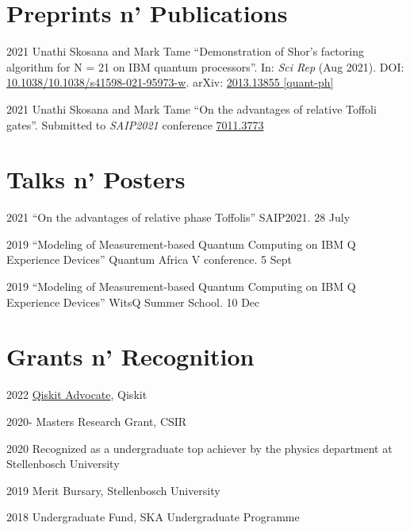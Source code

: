 \documentclass[12pt,letterpaper]{report}
\begin{document}
	\section*{Preprints n' Publications}
	\begin{tablist}
  \item[2021] \tab{}Unathi Skosana and Mark Tame \enquote{Demonstration of Shor’s factoring algorithm for N = 21 on IBM quantum processors}. In: \textit{Sci Rep} (Aug 2021). DOI: \href{https://doi.org/10.1038/s41598-021-95973-w}{10.1038/10.1038/s41598-021-95973-w}. arXiv: \href{https://arxiv.org/abs/2103.13855}{2013.13855 [quant-ph]}
	\item[2021] \tab{}Unathi Skosana and Mark Tame \enquote{On the advantages of relative Toffoli gates}. Submitted to \textit{SAIP2021} conference \href{https://events.saip.org.za/event/206/papers/7011/files/3773-on_the_advantages_of_relative_toffoli_gates.pdf}{7011.3773}
	\end{tablist}


	\section*{Talks n' Posters}

	\begin{tablist}
       \item[2021] \tab{}\enquote{On the advantages of relative phase Toffolis} SAIP2021. 28 July
	   \item[2019] \tab{}\enquote{Modeling of Measurement-based Quantum Computing on IBM Q Experience Devices} Quantum Africa V conference. 5 Sept
       \item[2019] \tab{}\enquote{Modeling of Measurement-based Quantum Computing on IBM Q Experience Devices} WitsQ Summer School. 10 Dec
	\end{tablist}

	\section*{Grants n' Recognition}

	\begin{tablist}
    \item[2022] \tab{} \href{https://qiskit.org/advocates/}{Qiskit Advocate},
      Qiskit
		\item[2020-] \tab{}Masters Research Grant, CSIR
		\item[2020] \tab{}Recognized as a undergraduate top achiever by the physics department at Stellenbosch University
		\item[2019] \tab{}Merit Bursary, Stellenbosch University
		\item[2018] \tab{}Undergraduate Fund, SKA Undergraduate Programme
	\end{tablist}
\end{document}
